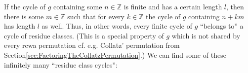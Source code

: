 \documentclass[a4paper,11pt]{report}
\begin{document}
{{\begin{Verbatim}[commandchars=!@|,fontsize=\small,frame=single,label=Example]
\end{Verbatim}
 If the cycle of $g$ containing some $n \in {\ensuremath{\mathbb Z}}$ is finite and has a certain length $l$, then there is some $m \in {\ensuremath{\mathbb Z}}$ such that for every $k \in {\ensuremath{\mathbb Z}}$ the cycle of $g$ containing $n + km$ has length $l$ as well. Thus, in other words, every finite cycle of $g$ ``belongs to'' a cycle of residue classes. (This is a special property of $g$ which is not shared by every rcwa permutation
\texttt{}\texttt{} cf. e.g. Collatz' permutation from
Section{\nobreakspace}\ref{sec:FactoringTheCollatzPermutation}.) We can find some of these infinitely many ``residue class cycles'': 
\begin{Verbatim}[commandchars=!@|,fontsize=\small,frame=single,label=Example]
  

\end{Verbatim}}}
\end{document}
